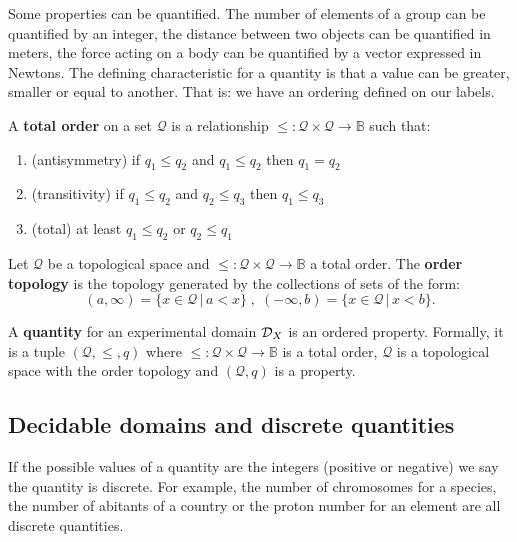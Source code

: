 \documentclass[11pt,letterpaper,fleqn]{memoir} %
\begin{document}
Some properties can be quantified. The number of elements of a group can be quantified by an integer, the distance between two objects can be quantified in meters, the force acting on a body can be quantified by a vector expressed in Newtons. The defining characteristic for a quantity is that a value can be greater, smaller or equal to another. That is: we have an ordering defined on our labels.
	
\begin{mathSection}
	\begin{defn}
		A \textbf{total order} on a set $\mathcal{Q}$ is a relationship $\leq : \mathcal{Q} \times \mathcal{Q} \to \mathbb{B}$ such that:
		\begin{enumerate}
			\item (antisymmetry) if $q_1 \leq q_2$ and $q_1 \leq q_2$ then $q_1 = q_2$
			\item (transitivity) if $q_1 \leq q_2$ and $q_2 \leq q_3$ then $q_1 \leq q_3$
			\item (total) at least $q_1 \leq q_2$ or $q_2 \leq q_1$
		\end{enumerate}
	\end{defn}
\begin{defn}
	Let $\mathcal{Q}$ be a topological space and $\leq : \mathcal{Q} \times \mathcal{Q} \to \mathbb{B}$ a total order. The \textbf{order topology} is the topology generated by the collections of sets of the form:
	$$(a, \infty) = \{x \in \mathcal{Q} \, | \, a < x\} \;,\; (-\infty, b) = \{x \in \mathcal{Q} \, | \, x < b\}.$$
\end{defn}
\begin{defn}
	A \textbf{quantity} for an experimental domain $\mathcal{D}_X$ is an ordered property. Formally, it is a tuple $(\mathcal{Q}, \leq, q)$ where $\leq : \mathcal{Q} \times \mathcal{Q} \to \mathbb{B}$ is a total order, $\mathcal{Q}$ is a topological space with the order topology and $(\mathcal{Q}, q)$ is a property.
\end{defn}
\end{mathSection}

\subsection{Decidable domains and discrete quantities}

If the possible values of a quantity are the integers (positive or negative) we say the quantity is discrete. For example, the number of chromosomes for a species, the number of abitants of a country or the proton number for an element are all discrete quantities.
\end{document}
